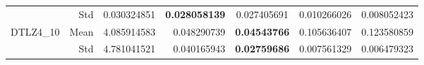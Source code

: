 \begin{table*}[htbp]
\begin{tabular}{rrrrrrr}
          & Std   & 0.030324851 & \textbf{0.028058139} & \multicolumn{1}{c}{0.027405691} & 0.010266026 & 0.008052423 \\
    \multirow{2}[0]{*}{DTLZ4\_10} & Mean  & 4.085914583 & 0.048290739 & \multicolumn{1}{c}{\textbf{0.04543766}} & 0.105636407 & 0.123580859 \\
          & Std   & 4.781041521 & 0.040165943 & \multicolumn{1}{c}{\textbf{0.02759686}} & 0.007561329 & 0.006479323 \\
    \bottomrule
    \end{tabular}%
  \label{tab:SP_DTLZ}%
\end{table*}%
